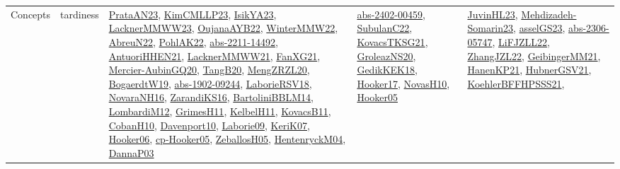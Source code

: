 {\begin{longtable}{llp{6cm}p{6cm}p{6cm}}
Concepts & tardiness & \href{articles/PrataAN23.pdf}{PrataAN23}\cite{PrataAN23}, \href{papers/KimCMLLP23.pdf}{KimCMLLP23}\cite{KimCMLLP23}, \href{articles/IsikYA23.pdf}{IsikYA23}\cite{IsikYA23}, \href{articles/LacknerMMWW23.pdf}{LacknerMMWW23}\cite{LacknerMMWW23}, \href{papers/OujanaAYB22.pdf}{OujanaAYB22}\cite{OujanaAYB22}, \href{papers/WinterMMW22.pdf}{WinterMMW22}\cite{WinterMMW22}, \href{articles/AbreuN22.pdf}{AbreuN22}\cite{AbreuN22}, \href{articles/PohlAK22.pdf}{PohlAK22}\cite{PohlAK22}, \href{articles/abs-2211-14492.pdf}{abs-2211-14492}\cite{abs-2211-14492}, \href{papers/AntuoriHHEN21.pdf}{AntuoriHHEN21}\cite{AntuoriHHEN21}, \href{papers/LacknerMMWW21.pdf}{LacknerMMWW21}\cite{LacknerMMWW21}, \href{articles/FanXG21.pdf}{FanXG21}\cite{FanXG21}, \href{papers/Mercier-AubinGQ20.pdf}{Mercier-AubinGQ20}\cite{Mercier-AubinGQ20}, \href{papers/TangB20.pdf}{TangB20}\cite{TangB20}, \href{articles/MengZRZL20.pdf}{MengZRZL20}\cite{MengZRZL20}, \href{papers/BogaerdtW19.pdf}{BogaerdtW19}\cite{BogaerdtW19}, \href{articles/abs-1902-09244.pdf}{abs-1902-09244}\cite{abs-1902-09244}, \href{articles/LaborieRSV18.pdf}{LaborieRSV18}\cite{LaborieRSV18}, \href{articles/NovaraNH16.pdf}{NovaraNH16}\cite{NovaraNH16}, \href{articles/ZarandiKS16.pdf}{ZarandiKS16}\cite{ZarandiKS16}, \href{papers/BartoliniBBLM14.pdf}{BartoliniBBLM14}\cite{BartoliniBBLM14}, \href{articles/LombardiM12.pdf}{LombardiM12}\cite{LombardiM12}, \href{papers/GrimesH11.pdf}{GrimesH11}\cite{GrimesH11}, \href{articles/KelbelH11.pdf}{KelbelH11}\cite{KelbelH11}, \href{articles/KovacsB11.pdf}{KovacsB11}\cite{KovacsB11}, \href{papers/CobanH10.pdf}{CobanH10}\cite{CobanH10}, \href{papers/Davenport10.pdf}{Davenport10}\cite{Davenport10}, \href{papers/Laborie09.pdf}{Laborie09}\cite{Laborie09}, \href{papers/KeriK07.pdf}{KeriK07}\cite{KeriK07}, \href{articles/Hooker06.pdf}{Hooker06}\cite{Hooker06}, \href{papers/cp-Hooker05.pdf}{cp-Hooker05}\cite{cp-Hooker05}, \href{articles/ZeballosH05.pdf}{ZeballosH05}\cite{ZeballosH05}, \href{papers/HentenryckM04.pdf}{HentenryckM04}\cite{HentenryckM04}, \href{papers/DannaP03.pdf}{DannaP03}\cite{DannaP03} & \href{articles/abs-2402-00459.pdf}{abs-2402-00459}\cite{abs-2402-00459}, \href{articles/SubulanC22.pdf}{SubulanC22}\cite{SubulanC22}, \href{papers/KovacsTKSG21.pdf}{KovacsTKSG21}\cite{KovacsTKSG21}, \href{papers/GroleazNS20.pdf}{GroleazNS20}\cite{GroleazNS20}, \href{articles/GedikKEK18.pdf}{GedikKEK18}\cite{GedikKEK18}, \href{papers/Hooker17.pdf}{Hooker17}\cite{Hooker17}, \href{articles/NovasH10.pdf}{NovasH10}\cite{NovasH10}, \href{articles/Hooker05.pdf}{Hooker05}\cite{Hooker05} & \href{papers/JuvinHL23.pdf}{JuvinHL23}\cite{JuvinHL23}, \href{papers/Mehdizadeh-Somarin23.pdf}{Mehdizadeh-Somarin23}\cite{Mehdizadeh-Somarin23}, \href{papers/asselGS23.pdf}{asselGS23}\cite{asselGS23}, \href{articles/abs-2306-05747.pdf}{abs-2306-05747}\cite{abs-2306-05747}, \href{papers/LiFJZLL22.pdf}{LiFJZLL22}\cite{LiFJZLL22}, \href{papers/ZhangJZL22.pdf}{ZhangJZL22}\cite{ZhangJZL22}, \href{papers/GeibingerMM21.pdf}{GeibingerMM21}\cite{GeibingerMM21}, \href{papers/HanenKP21.pdf}{HanenKP21}\cite{HanenKP21}, \href{articles/HubnerGSV21.pdf}{HubnerGSV21}\cite{HubnerGSV21}, \href{articles/KoehlerBFFHPSSS21.pdf}{KoehlerBFFHPSSS21}\cite{KoehlerBFFHPSSS21}, 
\end{longtable}}
